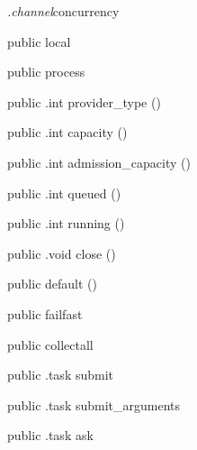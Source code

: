\begin{CrexxClass}{\textit{.channel}}{concurrency}

  \begin{Hierarchy}
  \end{Hierarchy}

  \begin{Members}

    \Factory
      {public}
      {local}
      {}

    \Factory
      {public}
      {process}
      {}

    \Method
      {public}
      {.int}
      {provider\_type}
      {()}

    \Method
      {public}
      {.int}
      {capacity}
      {()}

    \Method
      {public}
      {.int}
      {admission\_capacity}
      {()}

    \Method
      {public}
      {.int}
      {queued}
      {()}

    \Method
      {public}
      {.int}
      {running}
      {()}

    \Method
      {public}
      {.void}
      {close}
      {()}

    \Factory
      {public}
      {default}
      {()}

    \Factory
      {public}
      {failfast}
      {}

    \Factory
      {public}
      {collectall}
      {}

    \Method
      {public}
      {.task}
      {submit}
      {}

    \Method
      {public}
      {.task}
      {submit\_arguments}
      {}

    \Method
      {public}
      {.task}
      {ask}
      {}


\end{Members}
\end{CrexxClass}
